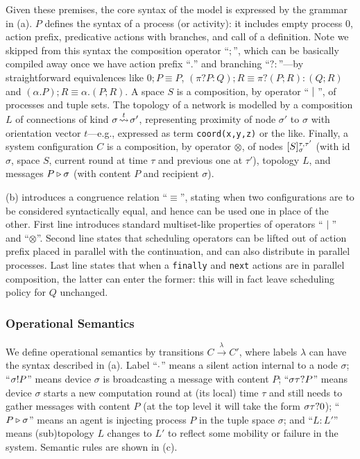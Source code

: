 \documentclass[12pt,a4paper,twoside,openright]{book}
\begin{document}
Given these premises, the core syntax of the model is expressed by the grammar in  (a). $P$ defines the syntax of a process (or activity): it includes empty process $0$, action prefix, predicative actions with branches, and call of a definition.
%
Note we skipped from this syntax the composition operator ``$;$'', which can be basically compiled away once we have action prefix ``$.$'' and branching ``$?:$''---by straightforward equivalences like $0;P\equiv P$, $(\pi?P:Q);R \equiv \pi?(P;R):(Q;R)$ and $(\alpha.P);R \equiv \alpha.(P;R)$.
%
A space $S$ is a composition, by operator ``$\opar$'', of processes and tuple sets.
%
The topology of a network is modelled by a composition $L$ of connections of kind $\near{\sigma}{\sigma'}{t}$, representing proximity of node $\sigma'$ to $\sigma$ with orientation vector $t$---e.g., expressed as term \texttt{coord(x,y,z)} or the like.
%
Finally, a system configuration $C$ is a composition, by operator $\otimes$, of nodes $\scope{S}{\sigma}{\tau,\tau'}$ (with id $\sigma$, space $S$, current round at time $\tau$ and previous one at $\tau'$), topology $L$, and messages $\mesg{P}{\sigma}$ (with content $P$ and recipient $\sigma$).

 (b) introduces a congruence relation ``$\equiv$'', stating when two configurations are to be considered syntactically equal, and hence can be used one in place of the other.
%
First line introduces standard multiset-like properties of operators ``$\opar$'' and ``$\otimes$''.
%
Second line states that scheduling operators can be lifted out of action prefix placed in parallel with the continuation, and can also distribute in parallel processes.
%
Last line states that when a \texttt{finally} and \texttt{next} actions are in parallel composition, the latter can enter the former: this will in fact leave scheduling policy for $Q$ unchanged.

\subsubsection{Operational Semantics}

We define operational semantics by transitions $C\xrightarrow{\lambda}C'$, where labels $\lambda$ can have the syntax described in  (a).
%
Label ``$\labsilent{\sigma}$'' means a silent action internal to a node $\sigma$; ``$\labmesg{\sigma}{P}$'' means device $\sigma$ is broadcasting a message with content $P$; ``$\labnew{\tau}{P}{\sigma}$'' means device $\sigma$ starts a new computation round at (its local) time $\tau$ and still needs to gather messages with content $P$ (at the top level it will take the form $\labnew{\tau}{0}{\sigma}$); ``$\mesg{P}{\sigma}$'' means an agent is injecting process $P$ in the tuple space $\sigma$; and ``$L:L'$'' means (sub)topology $L$ changes to $L'$ to reflect some mobility or failure in the system.
%
Semantic rules are shown in  (c).
\end{document}
